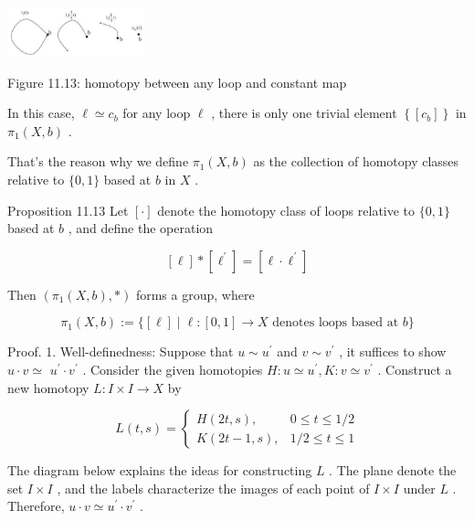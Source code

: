 \begin{center}
\includegraphics[max width=0.3\textwidth]{images/bo_d2bcsrref24c73avs720_114_591_1782_464_166_0.jpg}
\end{center}
\hspace*{3em} 

Figure 11.13: homotopy between any loop and constant map

In this case, \(\ell  \simeq  {c}_{b}\) for any loop \(\ell\) , there is only one trivial element \(\left\{  \left\lbrack  {c}_{b}\right\rbrack  \right\}\) in \({\pi }_{1}\left( {X,b}\right)\) .

That’s the reason why we define \({\pi }_{1}\left( {X,b}\right)\) as the collection of homotopy classes relative to \(\{ 0,1\}\) based at \(b\) in \(X\) .

Proposition 11.13 Let \(\left\lbrack  \cdot \right\rbrack\) denote the homotopy class of loops relative to \(\{ 0,1\}\) based at \(b\) , and define the operation

\[
\left\lbrack  \ell \right\rbrack   * \left\lbrack  {\ell }^{\prime }\right\rbrack   = \left\lbrack  {\ell  \cdot  {\ell }^{\prime }}\right\rbrack
\]

Then \(\left( {{\pi }_{1}\left( {X,b}\right) , * }\right)\) forms a group, where

\[
{\pi }_{1}\left( {X,b}\right)  \mathrel{\text{ := }} \{ \left\lbrack  \ell \right\rbrack   \mid  \ell  : \left\lbrack  {0,1}\right\rbrack   \rightarrow  X\text{ denotes loops based at }b\}
\]

Proof. 1. Well-definedness: Suppose that \(u \sim  {u}^{\prime }\) and \(v \sim  {v}^{\prime }\) , it suffices to show \(u \cdot  v \simeq\)  \({u}^{\prime } \cdot  {v}^{\prime }\) . Consider the given homotopies \(H : u \simeq  {u}^{\prime },K : v \simeq  {v}^{\prime }\) . Construct a new homotopy \(L : I \times  I \rightarrow  X\) by

\[
L\left( {t,s}\right)  = \left\{  \begin{array}{rr} H\left( {{2t},s}\right) , & 0 \leq  t \leq  1/2 \\  K\left( {{2t} - 1,s}\right) , & 1/2 \leq  t \leq  1 \end{array}\right.
\]

The diagram below explains the ideas for constructing \(L\) . The plane denote the set \(I \times  I\) , and the labels characterize the images of each point of \(I \times  I\) under \(L\) . Therefore, \(u \cdot  v \simeq  {u}^{\prime } \cdot  {v}^{\prime }\) .

